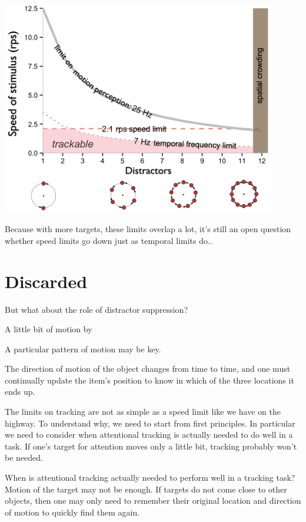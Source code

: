 \documentclass[]{book}
\begin{document}
\includegraphics[width=0.9\textwidth,height=\textheight]{imagesForRmd/trackingLimitsMotionLimitSchematic.png}

Because with more targets, these limits overlap a lot, it's still an open question whether speed limits go down just as temporal limits do..

\hypertarget{discarded}{%
\section{Discarded}\label{discarded}}

But what about the role of distractor suppression?

A little bit of motion by

A particular pattern of motion may be key.

The direction of motion of the object changes from time to time, and one must continually update the item's position to know in which of the three locations it ends up.

The limits on tracking are not as simple as a speed limit like we have on the highway. To understand why, we need to start from first principles. In particular we need to consider when attentional tracking is actually needed to do well in a task. If one's target for attention moves only a little bit, tracking probably won't be needed.

When is attentional tracking actually needed to perform well in a tracking task? Motion of the target may not be enough. If targets do not come close to other objects, then one may only need to remember their original location and direction of motion to quickly find them again.
\end{document}
